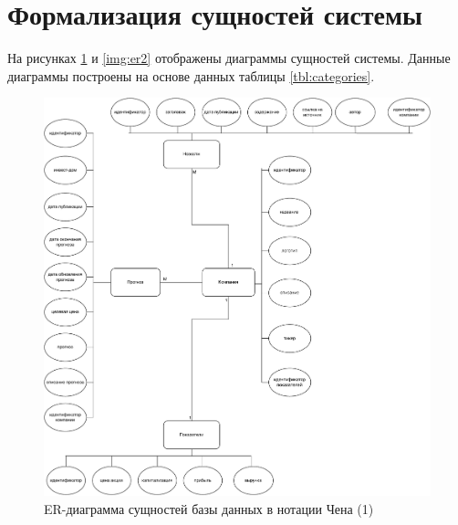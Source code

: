 \section{Формализация сущностей системы}
На рисунках \ref*{img:er1} и \ref*{img:er2} отображены диаграммы сущностей системы. Данные диаграммы построены на основе данных таблицы \ref*{tbl:categories}.
\begin{figure}[h!]
	\begin{center}
		\includegraphics[scale=0.6]{inc/img/er.pdf}
	\end{center}
	\captionsetup{justification=centering}
	\caption{ER-диаграмма сущностей базы данных в нотации Чена (1)}
	\label{img:er1}
\end{figure}
\newpage


